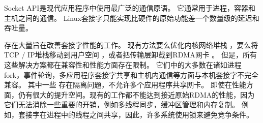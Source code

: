 
Socket API是现代应用程序中使用最广泛的通信原语。 它通常用于进程，容器和主机之间的通信。
Linux套接字只能实现比硬件的原始功能差一个数量级的延迟和吞吐量。

存在大量旨在改善套接字性能的工作。
现有方法要么优化内核网络堆栈 \cite {lin2016scalable,han2012megapipe,yasukata2016stackmap}，要么将TCP / IP堆栈移动到用户空间 \cite {jeong2014mtcp,marinos2014network,seastar,fstack,libvma}，或者把传输层卸载到RDMA网卡 \cite{rsockets,socketsdirect}。
但是，所有这些解决方案都在兼容性和性能方面存在限制。
它们中的大多数在诸如进程 fork，事件轮询，多应用程序套接字共享和主机内通信等方面与本机套接字不完全兼容。
其中一些 \cite {jeong2014mtcp}存在隔离问题，不允许多个应用程序共享网卡。
即使在性能方面，仍有很大的提升空间。现有的工作都不能达到接近原始RDMA的性能，因为它们无法消除一些重要的开销，例如多线程同步，缓冲区管理和内存复制。
例如，套接字在进程中的线程之间共享，因此，许多系统使用锁来避免竞争条件。

